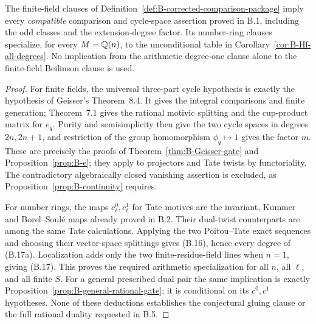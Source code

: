 \begin{proposition}
\label{prop:B-comparison-specializations}
The finite-field clauses of
Definition~\ref{def:B-corrected-comparison-package} imply every
\emph{compatible} comparison and cycle-space assertion proved in
B.1, including the odd classes and the extension-degree factor.
Its number-ring clauses specialize, for every \(M=\mathbb Q(n)\),
to the unconditional table in
Corollary~\ref{cor:B-Hf-all-degrees}.  No implication from the
arithmetic degree-one clause alone to the finite-field Beilinson
clause is used.
\end{proposition}
\begin{proof}
For finite fields, the universal three-part cycle hypothesis is
exactly the hypothesis of Geisser's Theorem~8.4.  It gives the
integral comparisons and finite generation; Theorem~7.1 gives
the rational motivic splitting and the cup-product matrix for
\(e_q\).  Purity and semisimplicity then give the two cycle
spaces in degrees \(2n,2n+1\), and restriction of the group
homomorphism \(\phi_q\mapsto1\) gives the factor \(m\).
These are precisely the proofs of
Theorem~\ref{thm:B-Geisser-gate} and
Proposition~\ref{prop:B-e}; they apply to projectors and Tate
twists by functoriality.  The contradictory algebraically closed
vanishing assertion is excluded, as
Proposition~\ref{prop:B-continuity} requires.

For number rings, the maps \(c^0_\ell,c^1_\ell\) for Tate
motives are the invariant, Kummer and Borel--Soul\'e maps already
proved in B.2.  Their dual-twist counterparts are among the same
Tate calculations.  Applying the two Poitou--Tate exact sequences
and choosing their vector-space splittings gives (B.16), hence
every degree of (B.17a).  Localization adds only the two
finite-residue-field lines when \(n=1\), giving (B.17).
This proves the required arithmetic specialization for all
\(n\), all \(\ell\), and all finite \(S\).  For a general
prescribed dual pair the same implication is exactly
Proposition~\ref{prop:B-general-rational-gate}; it is conditional
on its \(c^0,c^1\) hypotheses.  None of these deductions
establishes the conjectural gluing clause or the full rational
duality requested in B.5.
\end{proof}

